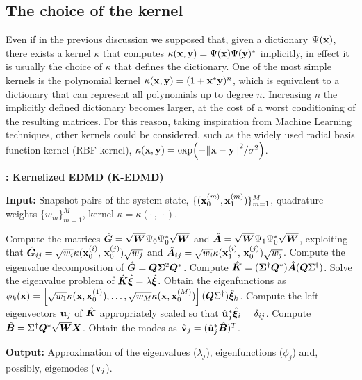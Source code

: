 \subsection{The choice of the kernel}
Even if in the previous discussion we supposed that, given a dictionary $\Psi(\vb{x})$, there exists a kernel $\kappa$ that computes $\kappa(\vb{x}, \vb{y}) = \Psi(\vb{x})\Psi(\vb{y})^*$ implicitly, in effect it is usually the choice of $\kappa$ that defines the dictionary. One of the most simple kernels is the polynomial kernel $\kappa(\vb{x}, \vb{y}) = (1 + \vb{x}^*\vb{y})^{n}$, which is equivalent to a dictionary that can represent all polynomials up to degree $n$. Increasing $n$ the implicitly defined dictionary becomes larger, at the cost of a worst conditioning of the resulting matrices. For this reason, taking inspiration from Machine Learning techniques, other kernels could be considered, such as the widely used radial basis function kernel (RBF kernel), $\kappa(\vb{x}, \vb{y}) = \exp(-\norm{\vb{x}-\vb{y}}^2 / \sigma^2)$.

\begin{algorithm}[h]
\caption{\textbf{: Kernelized EDMD (K-EDMD)}}
\label{alg_kedmd}
\textbf{Input:} Snapshot pairs of the system state, $\{(\vb{x}_0^{(m)}, \vb{x}_1^{(m)})\}_{m = 1}^M$, quadrature weights $\{w_m\}_{m = 1}^M$, kernel $\kappa = \kappa(\cdot\,,\,\cdot)$.
\begin{algorithmic}[1]
\State  Compute the matrices $\hat{\vb*{G}} = \sqrt{\vb*{W}}\Psi_0\Psi_0^*\sqrt{\vb*{W}}$ and  $\hat{\vb*{A}} = \sqrt{\vb*{W}}\Psi_1\Psi_0^*\sqrt{\vb*{W}}$, exploiting that $\hat{\vb*{G}}_{ij} = \sqrt{w_i} \kappa(\vb{x}_0^{(i)},\, \vb{x}_0^{(j)}) \sqrt{w_j}$ and
$\hat{\vb*{A}}_{ij} = \sqrt{w_i} \kappa(\vb{x}_1^{(i)},\, \vb{x}_0^{(j)}) \sqrt{w_j}$.
\State Compute the eigenvalue decomposition of $\hat{\vb*{G}} = \vb*{Q}\vb*{\Sigma}^2\vb*{Q}^*$.
\State Compute $\hat{\vb*{K}} = (\vb*{\Sigma}^{\dagger}\vb*{Q}^*)\hat{\vb*{A}} (\vb*{Q}\Sigma^{\dagger})$.
\State Solve the eigenvalue problem of $\hat{\vb*{K}}\hat{\bm{\xi}} = \lambda \hat{\bm{\xi}}$.
\State Obtain the eigenfunctions as $\phi_k(\vb{x}) = \left[\sqrt{w_1} \kappa(\vb{x}, \vb{x}_0^{(1)}), \dots, \sqrt{w_M} \kappa(\vb{x}, \vb{x}_0^{(M)})\right](\vb*{Q}\Sigma^{\dagger}) \hat{\bm{\xi}}_k$.
    \State Compute the left eigenvectors $\vb{u}_j$ of $\hat{\vb*{K}}$ appropriately scaled so that $\hat{\vb{u}}_j^*\hat{\bm{\xi}}_i = \delta_{ij}$.
    \State Compute $\hat{\vb*{B}} = \Sigma^{\dagger} \vb*{Q}^* \sqrt{\vb*{W}} \vb*{X}$.
    \State Obtain the modes as $\hat{\vb{v}}_j = (\hat{\vb{u}}_j^* \hat{\vb*{B}})^T$.
\EndIf
\end{algorithmic}
\textbf{Output:} Approximation of the eigenvalues ($\lambda_j$), eigenfunctions ($\phi_j$) and, possibly, eigemodes ($\vb{v}_j$).
\end{algorithm}

